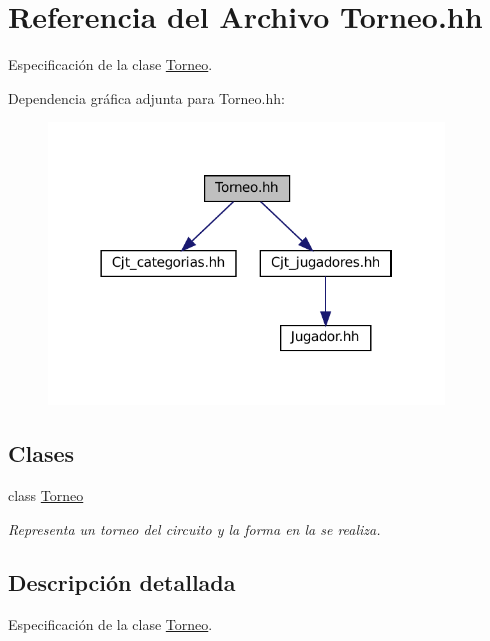 \hypertarget{_torneo_8hh}{}\section{Referencia del Archivo Torneo.\+hh}
\label{_torneo_8hh}


Especificación de la clase \hyperlink{class_torneo}{Torneo}.  


Dependencia gráfica adjunta para Torneo.\+hh\+:\nopagebreak
\begin{figure}[H]
\begin{center}
\leavevmode
\includegraphics[width=298pt]{_torneo_8hh__incl}
\end{center}
\end{figure}
\subsection*{Clases}
\begin{DoxyCompactItemize}
\item 
class \hyperlink{class_torneo}{Torneo}
\begin{DoxyCompactList}\small\item\em Representa un torneo del circuito y la forma en la se realiza. \end{DoxyCompactList}\end{DoxyCompactItemize}


\subsection{Descripción detallada}
Especificación de la clase \hyperlink{class_torneo}{Torneo}. 

